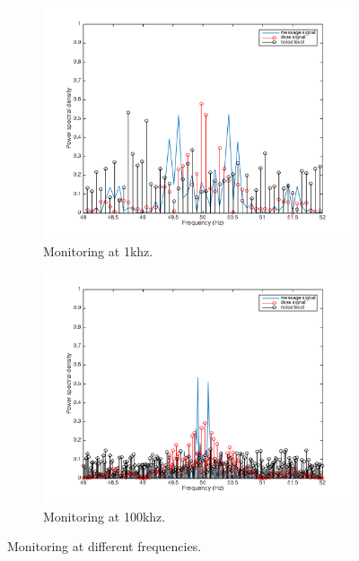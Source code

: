 \begin{figure}[H]
    \begin{subfigure}{.5\textwidth}
        \centering
        \includegraphics[width=1\linewidth]{images/figure1}
        \caption{Monitoring at 1khz.}
    \end{subfigure}
    \begin{subfigure}{.5\textwidth}
        \centering
        \includegraphics[width=1\linewidth]{images/figure2}
        \caption{Monitoring at 100khz.}
    \end{subfigure}
    \caption{Monitoring at different frequencies.}
    \label{fig:monitoringfrequencies}
\end{figure}

